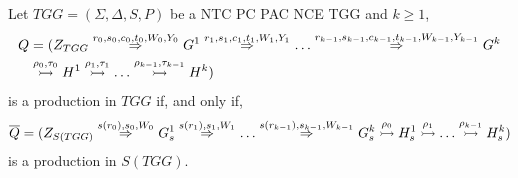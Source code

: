 \begin{theorem}
	\label{thm:one_d_enough_pac}
	Let $TGG = (\Sigma, \Delta, S, P)$ be a NTC PC PAC NCE TGG and $k \ge 1$,
	\begin{align*}
		Q & = (\startTG{TGG} \tderivpac{r_0}{s_0,c_0,t_0}{W_0,Y_0}{} G^1 \tderivpac{r_1}{s_1,c_1,t_1}{W_1,Y_1}{} \dots \tderivpac{r_{k-1}}{s_{k-1},c_{k-1},t_{k-1}}{W_{k-1},Y_{k-1}}{} G^k \\
		& \tresolv{\rho_0,\tau_0} H^1 \tresolv{\rho_1,\tau_1} \dots \tresolv{\rho_{k-1},\tau_{k-1}} H^k)
	\end{align*}
	is a production in $TGG$ if, and only if,
	\begin{equation*}
		\overline{Q} = (\startG{S(TGG)} \derivpac{s(r_0)}{s_0}{W_0}{} G^1_s \derivpac{s(r_1)}{s_1}{W_1}{} \dots \derivpac{s(r_{k-1})}{s_{k-1}}{W_{k-1}}{} G^k_s \tresolv{\rho_0} H_s^1 \tresolv{\rho_1} \dots \tresolv{\rho_{k-1}} H_s^k)
	\end{equation*}
	is a production in $S(TGG)$.
\end{theorem}
